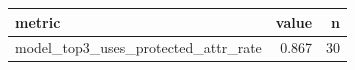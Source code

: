 \begin{tabular}{lrr}
\toprule
metric & value & n \\
\midrule
model_top3_uses_protected_attr_rate & 0.867 & 30 \\
\bottomrule
\end{tabular}
